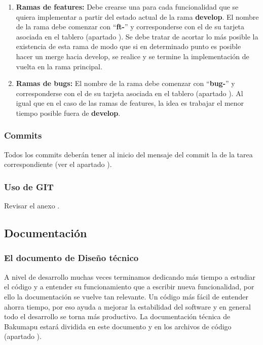 \begin{enumerate}
	\renewcommand{\labelenumi}{\alph{enumi}.}
	\item \textbf{Ramas de features:} Debe crearse una para cada funcionalidad que se quiera implementar a partir del estado actual de la rama \textbf{develop}. El nombre de la rama debe comenzar con “\textbf{ft-}” y corresponderse con el de su tarjeta asociada en el tablero (apartado ). Se debe tratar de acortar lo más posible la existencia de esta rama de modo que si en determinado punto es posible hacer un merge hacia develop, se realice y se termine la implementación de vuelta en la rama principal.
	
	\item \textbf{Ramas de bugs:} El nombre de la rama debe comenzar con “\textbf{bug-}” y corresponderse con el de su tarjeta asociada en el tablero (apartado ). Al igual que en el caso de las ramas de features, la idea es trabajar el menor tiempo posible fuera de \textbf{develop}.
\end{enumerate}

\subsubsection{Commits}
Todos los commits deberán tener al inicio del mensaje del commit la  de la tarea correspondiente (ver el apartado ).

\subsubsection{Uso de GIT}
Revisar el anexo .


\subsection{Documentación}\label{flujo:documentacion}

\subsubsection{El documento de Diseño técnico}\label{flujo:documento-de-diseno}
A nivel de desarrollo muchas veces terminamos dedicando más tiempo a estudiar el código y a entender su funcionamiento que a escribir nueva funcionalidad, por ello la documentación se vuelve tan relevante. Un código más fácil de entender ahorra tiempo, por eso ayuda a mejorar la estabilidad del software y en general todo el desarrollo se torna más productivo. La documentación técnica de Bakumapu estará dividida en este documento y en los archivos de código (apartado ).

